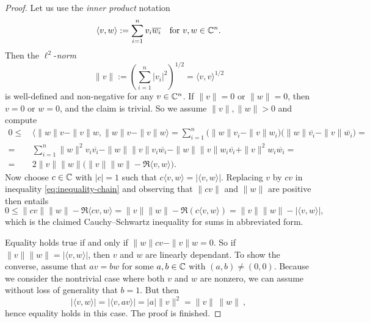 \begin{proof}
Let us use the \emph{inner product} notation 
\[
   \langle v,w\rangle := \sum_{i=1}^n v_i \overline{w_i} \quad \text{for } v,w\in \mathbb{C}^n.
\]
Then the $\ell^2$-\emph{norm}
\[
  \| v \| :=  \left( \sum_{i=1}^n |v_i|^2\right)^{1/2} = \langle v , v \rangle^{1/2}
\]
is well-defined and non-negative for any $v\in \mathbb{C}^n$. If $\|v \| =0$ or $\| w \|= 0$, then $v=0$ or $w=0$, and 
the claim is trivial. So we assume $\|v \|, \| w \| > 0$ and compute 
\begin{equation}
\label{eq:inequality-chain}
\begin{split}
  0 \leq \, & \big\langle \|w\| v - \|v\| w , \|w\| v - \|v\| w \big\rangle  = 
  \sum_{i=1}^n \big( \|w\| v_i - \|v\| w_i \big)\big( \|w\| \overline{v_i} - \|v\| \overline{w_i} \big)  = \\ 
  = \, &   \sum_{i=1}^n \|w\|^2 v_i\overline{v_i} - \|w\| \|v\| v_i \overline{w_i}  -  \|w\| \|v\| w_i \overline{v_i} 
    +  \|v\|^2 w_i\overline{w_i}  = \\
  = \, &  2 \|v\|\|w\| \Big(  \|v\|\|w\| - \Re \langle v,w \rangle \Big) .
\end{split}
\end{equation}
Now choose $c \in \mathbb{C}$ with $|c|=1$ such that $ c \langle  v,w \rangle = |\langle  v,w \rangle|$. Replacing $v$ by $cv$ 
in inequality \eqref{eq:inequality-chain} and observing that $\|cv \|$ and $ \| w \| $ are positive then entails
\[
  0 \leq \|c v\|\|w\| - \Re \langle c v,w \rangle  =  \|v\|\|w\| - \Re (c \langle v,w \rangle) =
  \|v\|\|w\| -  |\langle  v,w \rangle|,
\] 
which is the claimed Cauchy--Schwartz inequality for sums in abbreviated form. 

Equality holds true if and only if $\|w\| c v - \|v\| w =0$. So if $\|v\|\|w\| =  |\langle  v,w \rangle| $,
then $v$ and $w$ are linearly dependant. To show the converse, assume that $av =bw$ for some $a,b\in \mathbb{C}$ 
with $(a,b) \neq (0,0)$. Because we consider  the nontrivial case where both $v$ and $w$ are nonzero, we can 
assume without loss of generality that $b=1$. But then 
\[ |\langle v,w \rangle |= |\langle v, av \rangle | = |a| \|v\|^2 = \|v\| \, \|w\| \ , \]
hence equality holds in this case. The proof is finished.
\end{proof}

